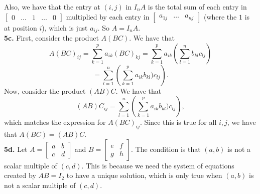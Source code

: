 \documentclass{article}
\begin{document}
Also, we have that the entry at $(i, j)$ in $I_nA$ is the total sum of each entry in
$\begin{bmatrix}
    0 & \ldots & 1 & \ldots & 0
\end{bmatrix}$
multiplied by each entry in
$\begin{bmatrix}
    a_{1j} & \ldots & a_{nj}
\end{bmatrix}$ (where the $1$ is at position $i$), which is just $a_{ij}$. So $A = I_nA$. \\

\textbf{5c.} First, consider the product $A(BC)$. We have that $$A(BC)_{ij} = \sum_{k = 1}^p a_{ik}(BC)_{kj} = \sum_{k = 1}^p a_{ik}\left(\sum_{l = 1}^n b_{kl}c_{lj}\right)$$
$$= \sum_{l = 1}^n\left(\sum_{k = 1}^p a_{ik}b_{kl})c_{lj}\right).$$
Now, consider the product $(AB)C$. We have that
$$(AB)C_{ij} = \sum_{l = 1}^n\left(\sum_{k = 1}^p a_{ik}b_{kl})c_{lj}\right),$$
which matches the expression for $A(BC)_{ij}$. Since this is true for all $i, j$, we have that $A(BC) = (AB)C$.\\

\textbf{5d.} Let $A = \begin{bmatrix} a & b \\ c & d \end{bmatrix}$ and $B = \begin{bmatrix} e & f \\ g & h \end{bmatrix}$. The condition is that $(a, b)$ is not a scalar multiple of $(c, d)$. This is because we need the system of equations created by $AB = I_2$ to have a unique solution, which is only true when $(a, b)$ is not a scalar multiple of $(c, d)$. \\
\end{document}
